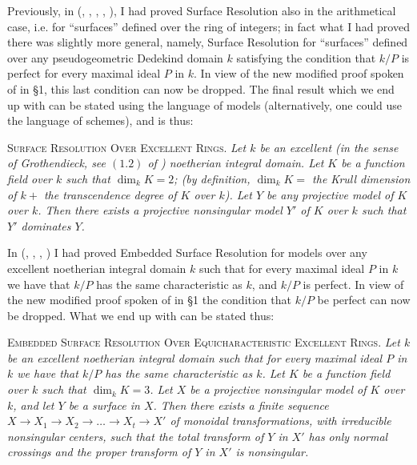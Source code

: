 Previously, in (\cite{art01-key1}, \cite{art01-key5}, \cite{art01-key6}, \cite{art01-key7}, \cite{art01-key8}), I had proved Surface Resolution also in the arithmetical case, i.e. for ``surfaces'' defined over the ring of integers; in fact what I had proved there was slightly more general, namely, Surface Resolution for ``surfaces'' defined over any pseudogeometric Dedekind domain $k$ satisfying the condition that $k/P$ is perfect for every maximal ideal $P$ in $k$. In view of the new modified proof spoken of in \S1, this last condition can now be dropped. The final result which we end up with can be stated using the language of models (alternatively, one could use the language of schemes), and is thus:

\medskip
\textsc{Surface Resolution Over Excellent Rings.} {\em Let $k$ be an excellent (in the sense of Grothendieck, see $(1.2)$ of \cite{art01-key10}) noetherian integral domain. Let $K$ be a function field over $k$ such that $\dim_{k}K=2$; (by definition, $\dim_{k}K=$ the Krull dimension of $k+{}$ the transcendence degree of $K$ over $k$). Let $Y$ be any projective model of $K$ over $k$. Then there exists a projective nonsingular model $Y'$ of $K$ over $k$ such that $Y'$ dominates $Y$.}

In (\cite{art01-key7}, \cite{art01-key9}, \cite{art01-key10}, \cite{art01-key11}) I had proved Embedded Surface Resolution for models over any excellent noetherian integral domain $k$ such that for every maximal ideal $P$ in $k$ we have that $k/P$ has the same characteristic as $k$, and $k/P$ is perfect. In view of the new modified proof spoken of in \S1 the condition that $k/P$ be perfect can now be dropped. What we end up with can be stated thus:

\medskip
\textsc{Embedded Surface Resolution Over Equicharacteristic Excellent Rings.} {\em Let $k$ be an excellent noetherian integral domain such that for every maximal ideal $P$ in $k$ we have that $k/P$ has the same characteristic as $k$. Let $K$ be a function field over $k$ such that $\dim_{k}K=3$. Let $X$ be a projective nonsingular model of $K$ over $k$, and let $Y$ be a surface in $X$. Then there exists a finite sequence $X\to X_{1}\to X_{2}\to \ldots \to X_{t}\to X'$ of monoidal transformations, with irreducible nonsingular centers, such that the total transform of $Y$ in $X'$ has only normal crossings and the proper transform of $Y$ in $X'$ is nonsingular.}

